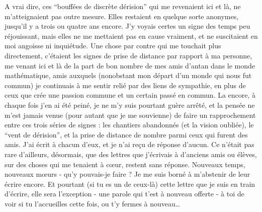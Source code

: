 A vrai dire, ces ``bouffées de discrète dérision'' qui me revenaient ici et là, ne m'atteignaient pas outre mesure. Elles restaient en quelque sorte anonymes, jusqu'il y a trois ou quatre ans encore. J'y voyais certes un signe des temps peu réjouissant, mais elles ne me mettaient pas en cause vraiment, et ne suscitaient en moi angoisse ni inquiétude. Une chose par contre qui me touchait plus directement, c'étaient les signes de prise de distance par rapport à ma personne, me venant ici et là de la part de bon nombre de mes amis d'antan dans le monde mathématique, amis auxquels (nonobstant mon départ d'un monde qui nous fut commun) je continuais à me sentir relié par des liens de sympathie, en plus de ceux que crée une passion commune et un certain passé en commun. La encore, à chaque fois j'en ai été peiné, je ne m'y suis pourtant guère arrêté, et la pensée ne m'est jamais venue (pour autant que je me souvienne) de faire un rapprochement entre ces trois séries de signes : les chantiers abandonnés (et la vision oubliée), le ``vent de dérision'', et la prise de distance de nombre parmi ceux qui furent des amis. J'ai écrit à chacun d'eux, et je n'ai reçu de réponse d'aucun. Ce n'était pas rare d'ailleurs, désormais, que des lettres que j'écrivais à d'anciens amis ou élèves, sur des choses qui me tenaient à cœur, restent sans réponse. Nouveaux temps, nouveaux mœurs - qu'y pouvais-je faire ? Je me suis borné à m'abstenir de leur écrire encore. Et pourtant (si tu es un de ceux-là) cette lettre que je suis en train d'écrire, elle sera l'exception - une parole qui t'est à nouveau offerte - à toi de voir si tu l'accueilles cette fois, ou t'y fermes à nouveau\ldots

